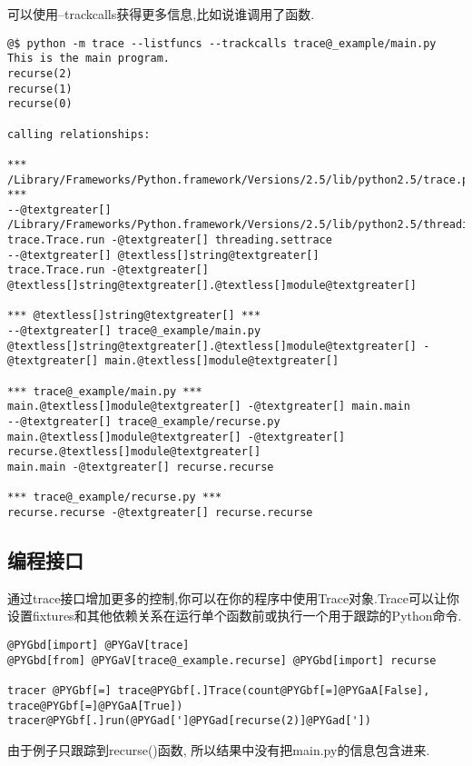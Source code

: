 \documentclass[letterpaper,10pt,english]{manual}
\begin{document}
可以使用--trackcalls获得更多信息,比如说谁调用了函数.

\begin{Verbatim}[commandchars=@\[\]]
@$ python -m trace --listfuncs --trackcalls trace@_example/main.py
This is the main program.
recurse(2)
recurse(1)
recurse(0)

calling relationships:

*** /Library/Frameworks/Python.framework/Versions/2.5/lib/python2.5/trace.py ***
--@textgreater[] /Library/Frameworks/Python.framework/Versions/2.5/lib/python2.5/threading.py
trace.Trace.run -@textgreater[] threading.settrace
--@textgreater[] @textless[]string@textgreater[]
trace.Trace.run -@textgreater[] @textless[]string@textgreater[].@textless[]module@textgreater[]

*** @textless[]string@textgreater[] ***
--@textgreater[] trace@_example/main.py
@textless[]string@textgreater[].@textless[]module@textgreater[] -@textgreater[] main.@textless[]module@textgreater[]

*** trace@_example/main.py ***
main.@textless[]module@textgreater[] -@textgreater[] main.main
--@textgreater[] trace@_example/recurse.py
main.@textless[]module@textgreater[] -@textgreater[] recurse.@textless[]module@textgreater[]
main.main -@textgreater[] recurse.recurse

*** trace@_example/recurse.py ***
recurse.recurse -@textgreater[] recurse.recurse
\end{Verbatim}


\subsection{编程接口}

通过trace接口增加更多的控制,你可以在你的程序中使用Trace对象.Trace可以让你设置fixtures和其他依赖关系在运行单个函数前或执行一个用于跟踪的Python命令.

\begin{Verbatim}[commandchars=@\[\]]
@PYGbd[import] @PYGaV[trace]
@PYGbd[from] @PYGaV[trace@_example.recurse] @PYGbd[import] recurse

tracer @PYGbf[=] trace@PYGbf[.]Trace(count@PYGbf[=]@PYGaA[False], trace@PYGbf[=]@PYGaA[True])
tracer@PYGbf[.]run(@PYGad[']@PYGad[recurse(2)]@PYGad['])
\end{Verbatim}

由于例子只跟踪到recurse()函数, 所以结果中没有把main.py的信息包含进来.
\end{document}
